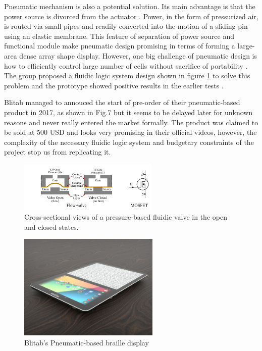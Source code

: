 Pneumatic mechanism is also a potential solution.
Its main advantage is that the power source is divorced from the actuator \cite{russomanno_design_2015}.
Power, in the form of pressurized air, is routed via small pipes and readily converted into the motion of a sliding pin using an elastic membrane.
This feature of separation of power source and functional module make pneumatic design promising in terms of forming a large-area dense array shape display.
However, one big challenge of pneumatic design is how to efficiently control large number of cells without sacrifice of portability \cite{russomanno_model-based_2017}.
The group proposed a fluidic logic system design shown in figure \ref{fig:pneumatic-schema} to solve this problem and the prototype showed positive results in the earlier tests \cite{russomanno_design_2015}.

Blitab managed to annouced the start of pre-order of their pneumatic-based product in 2017, as shown in Fig.7 but it seems to be delayed later for unknown reasons and never really entered the market formally. The product was claimed to be sold at 500 USD and looks very promising in their official videos, however, the complexity of the necessary fluidic logic system and budgetary constraints of the project stop us from replicating it.

\begin{figure}\centering
    \includegraphics[width=0.6\textwidth]{figures/pneumatic-schema.png}
\caption{Cross-sectional views of a pressure-based fluidic valve in the open and closed states.}
\label{fig:pneumatic-schema}
\end{figure}

\begin{figure}\centering
    \includegraphics[width=0.6\textwidth]{figures/Blitab_product.jpg}
\caption{Blitab's Pneumatic-based braille display}
\label{fig:Blitab-product}
\end{figure}